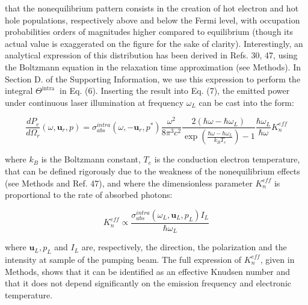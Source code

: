 \documentclass[10pt]{article}
\begin{document}
that the nonequilibrium pattern consists in the creation of hot electron and hot hole populations, respectively above and below the Fermi level, with occupation probabilities orders of magnitudes higher compared to equilibrium (though its actual value is exaggerated on the figure for the sake of clarity). Interestingly, an analytical expression of this distribution has been derived in Refs. 30, 47, using the Boltzmann equation in the relaxation time approximation (see Methods). In Section D. of the Supporting Information, we use this expression to perform the integral $\Theta^{\text {intra }}$ in Eq. (6). Inserting the result into Eq. (7), the emitted power under continuous laser illumination at frequency $\omega_{L}$ can be cast into the form:


\begin{equation*}
\frac{d P_{e}}{d \Omega_{r}}\left(\omega, \boldsymbol{u}_{r}, p\right)=\sigma_{a b s}^{i n t r a}\left(\omega,-\boldsymbol{u}_{r}, p^{*}\right) \frac{\omega^{2}}{8 \pi^{3} c^{2}} \frac{2\left(\hbar \omega-\hbar \omega_{L}\right)}{\exp \left(\frac{\hbar \omega-\hbar \omega_{L}}{k_{B} T_{e}}\right)-1} \frac{\hbar \omega_{L}}{\hbar \omega} K_{n}^{e f f} \tag{9}
\end{equation*}


where $k_{B}$ is the Boltzmann constant, $T_{e}$ is the conduction electron temperature, that can be defined rigorously due to the weakness of the nonequilibrium effects (see Methods and Ref. 47), and where the dimensionless parameter $K_{n}^{e f f}$ is proportional to the rate of absorbed photons:


\begin{equation*}
K_{n}^{e f f} \propto \frac{\sigma_{a b s}^{i n t r a}\left(\omega_{L}, \boldsymbol{u}_{L}, p_{L}\right) I_{L}}{\hbar \omega_{L}} \tag{10}
\end{equation*}


where $\boldsymbol{u}_{L}, p_{L}$ and $I_{L}$ are, respectively, the direction, the polarization and the intensity at sample of the pumping beam. The full expression of $K_{n}^{e f f}$, given in Methods, shows that it can be identified as an effective Knudsen number and that it does not depend significantly on the emission frequency and electronic temperature.
\end{document}
